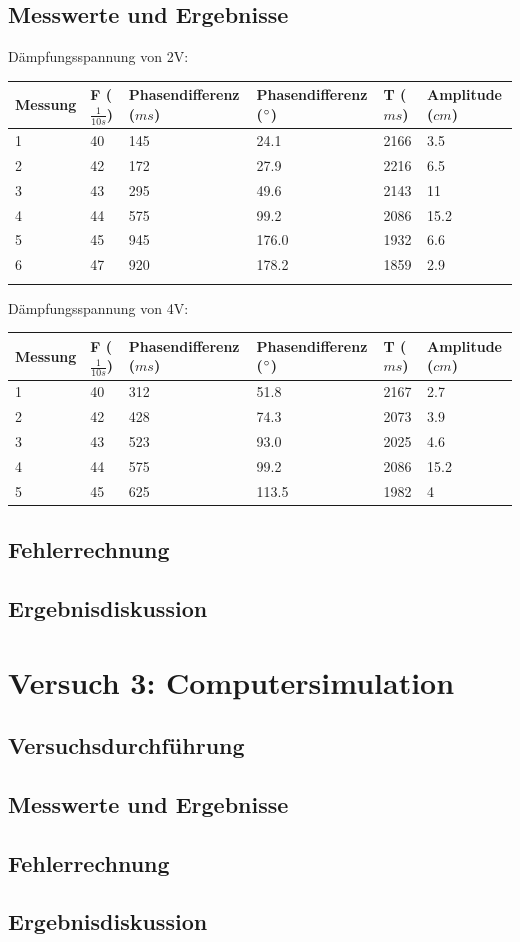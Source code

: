 \documentclass{scrartcl}
\begin{document}
\subsection{Messwerte und Ergebnisse}
Dämpfungsspannung von 2V:\\
\begin{tabular}{llllll}
Messung &F ($\frac{1}{10s}$)&Phasendifferenz ($ms$)&Phasendifferenz ($\degree$)&T ($ms$)&Amplitude ($cm$)\\\hline
1&40&145&24.1&2166&3.5\\
2&42&172&27.9&2216&6.5\\
3&43&295&49.6&2143&11\\
4&44&575&99.2&2086&15.2\\
5&45&945&176.0&1932&6.6\\
6&47&920&178.2&1859&2.9\\\\
\end{tabular}

Dämpfungsspannung von 4V:\\
\begin{tabular}{llllll}
Messung &F ($\frac{1}{10s}$)&Phasendifferenz ($ms$)&Phasendifferenz ($\degree$)&T ($ms$)&Amplitude ($cm$)\\\hline
1&40&312&51.8&2167&2.7\\
2&42&428&74.3&2073&3.9\\
3&43&523&93.0&2025&4.6\\
4&44&575&99.2&2086&15.2\\
5&45&625&113.5&1982&4\\
\end{tabular}
\subsection{Fehlerrechnung}

\subsection{Ergebnisdiskussion}


\section{Versuch 3: Computersimulation}
\subsection{Versuchsdurchführung}

\subsection{Messwerte und Ergebnisse}

\subsection{Fehlerrechnung}

\subsection{Ergebnisdiskussion}
\end{document}
